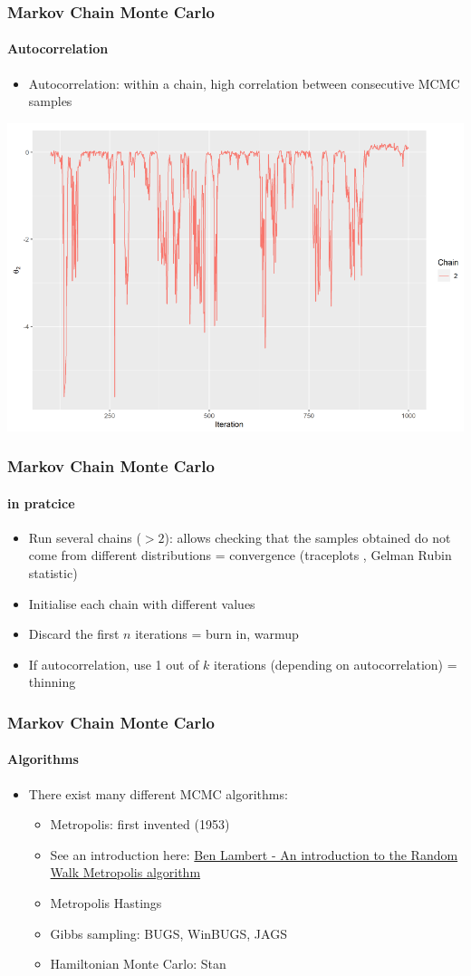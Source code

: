 \documentclass{beamer}
\begin{document}
\begin{frame}
\frametitle{Markov Chain Monte Carlo}
\framesubtitle{Autocorrelation}
\begin{itemize}
 \item{Autocorrelation: within a chain, high correlation between consecutive MCMC samples}
\end{itemize}
\includegraphics[width=\textwidth]{imgs/autocorrelation.png}

\end{frame}

\begin{frame}
\frametitle{Markov Chain Monte Carlo}
\framesubtitle{in pratcice}
\begin{itemize}
 \item{Run several chains ($> 2$): allows checking that the samples obtained do not come from different distributions = convergence (traceplots , Gelman Rubin statistic)}
 \item{Initialise each chain with different values}
 \item{Discard the first $n$ iterations = burn in, warmup}
 \item{If autocorrelation, use 1 out of $k$ iterations (depending on autocorrelation) = thinning}
\end{itemize}
\end{frame}

\begin{frame}
\frametitle{Markov Chain Monte Carlo}
\framesubtitle{Algorithms}
\begin{itemize}
  \item{There exist many different MCMC algorithms:}
 \begin{itemize}
  \item{Metropolis: first invented (1953)}
  \item[]{\scriptsize See an introduction here: \href{https:youtu.be/U561HGMWjcw}{Ben Lambert - An introduction to the Random Walk Metropolis algorithm}}
  \item{Metropolis Hastings}
  \item{Gibbs sampling: BUGS, WinBUGS, JAGS}
 \item{Hamiltonian Monte Carlo: Stan}
 \end{itemize}
\end{itemize}
\end{frame}
\end{document}
